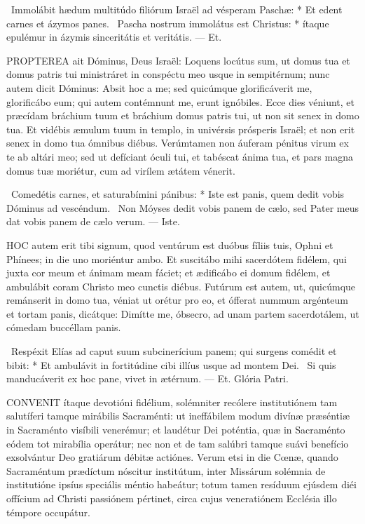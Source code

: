\R\ Immolábit hædum multitúdo filiórum Israël ad vésperam Paschæ: * Et edent carnes et ázymos panes. \V\ Pascha nostrum immolátus est Christus: * ítaque epulémur in ázymis sinceritátis et veritátis. --- Et.


\lettrine[lines=2]{P}{ROPTEREA} ait Dóminus, Deus Israël: Loquens locútus sum, ut domus tua et domus patris tui ministráret in conspéctu meo usque in sempitérnum; nunc autem dicit Dóminus: Absit hoc a me; sed quicúmque glorificáverit me, glorificábo eum; qui autem contémnunt me, erunt ignóbiles. Ecce dies véniunt, et præcídam bráchium tuum et bráchium domus patris tui, ut non sit senex in domo tua. Et vidébis æmulum tuum in templo, in univérsis prósperis Israël; et non erit senex in domo tua ómnibus diébus. Verúmtamen non áuferam pénitus virum ex te ab altári meo; sed ut defíciant óculi tui, et tabéscat ánima tua, et pars magna domus tuæ moriétur, cum ad virílem ætátem vénerit.

\R\ Comedétis carnes, et saturabímini pánibus: * Iste est panis, quem dedit vobis Dóminus ad vescéndum. \V\ Non Móyses dedit vobis panem de cælo, sed Pater meus dat vobis panem de cælo verum. --- Iste.


\lettrine[lines=2]{H}{OC} autem erit tibi signum, quod ventúrum est duóbus fíliis tuis, Ophni et Phínees; in die uno moriéntur ambo. Et suscitábo mihi sacerdótem fidélem, qui juxta cor meum et ánimam meam fáciet; et ædificábo ei domum fidélem, et ambulábit coram Christo meo cunctis diébus. Futúrum est autem, ut, quicúmque remánserit in domo tua, véniat ut orétur pro eo, et ófferat nummum argénteum et tortam panis, dicátque: Dimítte me, óbsecro, ad unam partem sacerdotálem, ut cómedam buccéllam panis.

\R\ Respéxit Elías ad caput suum subcinerícium panem; qui surgens comédit et bibit: * Et ambulávit in fortitúdine cibi illíus usque ad montem Dei. \V\ Si quis manducáverit ex hoc pane, vivet in ætérnum. --- Et. Glória Patri.





\lettrine[lines=2]{C}{ONVENIT} ítaque devotióni fidélium, solémniter recólere institutiónem tam salutíferi tamque mirábilis Sacraménti: ut ineffábilem modum divínæ præséntiæ in Sacraménto visíbili venerémur; et laudétur Dei poténtia, quæ in Sacraménto eódem tot mirabília operátur; nec non et de tam salúbri tamque suávi benefício exsolvántur Deo gratiárum débitæ actiónes. Verum etsi in die Cœnæ, quando Sacraméntum prædíctum nóscitur institútum, inter Missárum solémnia de institutióne ipsíus speciális méntio habeátur; totum tamen resíduum ejúsdem diéi offícium ad Christi passiónem pértinet, circa cujus veneratiónem Ecclésia illo témpore occupátur.

